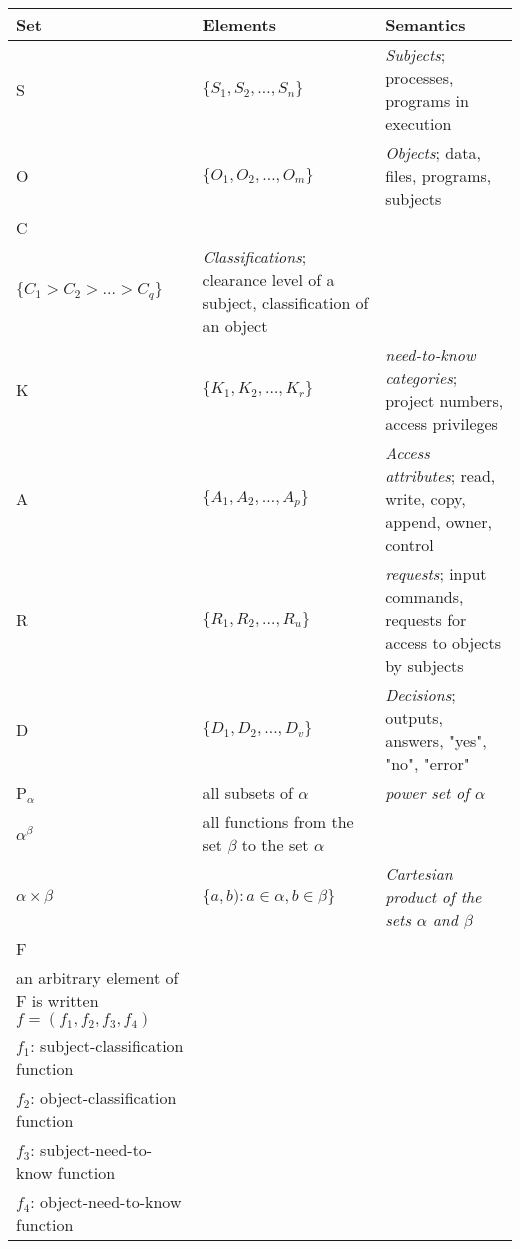 \begin{table}[ht]
\begin{tabular}{|p{3cm}|p{6cm}|p{7cm}|}
\hline
Set & Elements & Semantics \\
\hline
\hline
S & $\{S_1, S_2, \hdots, S_n\}$ & {\it Subjects}; processes, programs in execution \\
\hline
O & $\{O_1, O_2, \hdots, O_m\}$ & {\it Objects}; data, files, programs, subjects \\
\hline
C & \begin{minipage}{5.5cm}$\{C_1, C_2, \hdots, C_q\}$\\$\{C_1 > C_2 > \hdots > C_q\} $\end{minipage} & {\it
Classifications}; clearance level of a subject, classification of an object \\
\hline
K & $\{K_1, K_2, \hdots, K_r\}$ & {\it need-to-know categories}; project numbers, access privileges \\
\hline
A & $\{A_1, A_2, \hdots, A_p\}$ & {\it Access attributes}; read, write, copy, append, owner, control \\
\hline
R & $\{R_1, R_2, \hdots, R_u\}$ & {\it requests}; input commands, requests for access to objects by
subjects \\
\hline
D & $\{D_1, D_2, \hdots, D_v\}$ & {\it Decisions}; outputs, answers,  "yes", "no", "error" \\
\hline
P$_\alpha$ & all subsets of $\alpha$ & {\it power set of $\alpha$} \\
\hline
$\alpha^\beta$ & all functions from the set $\beta$ to the set $\alpha$ & { } \\
\hline
$\alpha  \times \beta$ & $\{a,b): a \in \alpha, b \in \beta\}$ & {\it Cartesian product of the sets
$\alpha$ and $\beta$} \\
\hline
F & \begin{minipage}{5.5cm}$C \times C^O \times (PK)^S \times (PK)^O$\\ an arbitrary element of F is written
$f=(f_1,f_2,f_3,f_4)$\end{minipage} & \begin{minipage}{6.5cm}{\it classification/need-to-know
vectors};\\$f_1$: subject-classification function\\
           $f_2$: object-classification function\\
           $f_3$: subject-need-to-know function\\
           $f_4$: object-need-to-know function
           \end{minipage} \\

\end{tabular}
\end{table}

